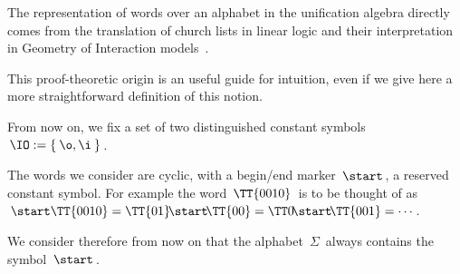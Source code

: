 The representation of words over an alphabet in the unification algebra directly comes from the translation of church lists in linear logic and their interpretation in Geometry of Interaction models~\cite{girard_geometry_1989,girard_geometry_1995}.

This proof-theoretic origin is an useful guide for intuition, even if we give here a more straightforward definition of this notion.

\medskip
From now on, we fix a set of two distinguished constant symbols $\,\IO:=\{\:\o,\i\:\}\,$.


The words we consider are cyclic, with a begin/end marker $\,\start\,$, a reserved constant symbol.
For example the word $\,\TT{0010}\,$ is to be thought of as $\,\start\TT{0010}=\TT{01}\!\start\!\TT{00}=\TT0\!\start\!\TT{001}=\cdots\,$.

We consider therefore from now on that the alphabet $\,\Sigma\,$ always contains the symbol $\,\start\,$.

